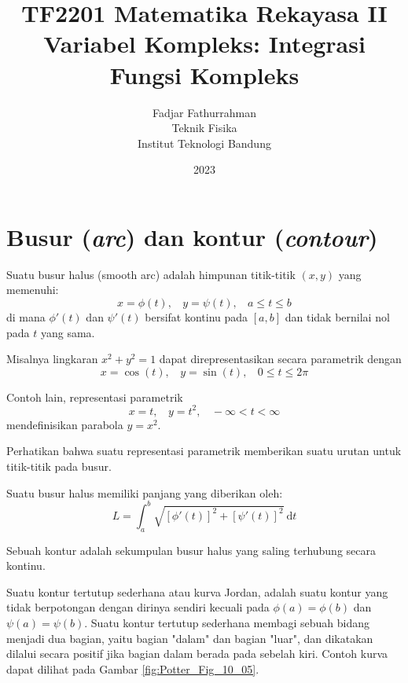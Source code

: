 



\title{%
{\small TF2201 Matematika Rekayasa II}\\
Variabel Kompleks: Integrasi Fungsi Kompleks
}
\author{Fadjar Fathurrahman\\
Teknik Fisika\\
Institut Teknologi Bandung}
\date{2023}
\maketitle


\section{Busur (\textit{arc}) dan kontur (\textit{contour})}

Suatu busur halus (smooth arc) adalah himpunan titik-titik $(x,y)$
yang memenuhi:
\begin{equation*}
x=\phi(t),\ \ \ \ y=\psi(t),\ \ \ \ a\leq t\leq b
\end{equation*}
di mana $\phi'(t)$ dan $\psi'(t)$ bersifat kontinu pada $[a,b]$
dan tidak bernilai nol pada $t$ yang sama.

Misalnya lingkaran $x^{2} + y^{2} = 1$ dapat direpresentasikan secara
parametrik dengan
\begin{equation*}
x=\cos(t),\ \ \ \ y=\sin(t),\ \ \ \ 0 \leq t \leq 2\pi
\end{equation*}

Contoh lain, representasi parametrik
\begin{equation*}
x=t,\ \ \ \ y=t^{2},\ \ \ \ -\infty<t<\infty    
\end{equation*}
mendefinisikan parabola $y=x^{2}$.

Perhatikan bahwa suatu representasi parametrik memberikan suatu urutan
untuk titik-titik pada busur.

Suatu busur halus memiliki panjang yang diberikan oleh:
\begin{equation*}
L = \int_{a}^{b} \sqrt{\left[\phi'(t)\right]^{2}+\left[\psi'(t)\right]^{2}}\ \mathrm{d}t    
\end{equation*}

Sebuah kontur adalah sekumpulan busur halus yang saling terhubung
secara kontinu.

Suatu kontur tertutup sederhana atau kurva Jordan, adalah suatu kontur
yang tidak berpotongan dengan dirinya sendiri kecuali pada $\phi(a)=\phi(b)$
dan $\psi(a)=\psi(b)$. Suatu kontur tertutup sederhana membagi sebuah
bidang menjadi dua bagian, yaitu bagian "dalam" dan bagian "luar",
dan dikatakan dilalui secara positif jika bagian dalam berada pada
sebelah kiri. Contoh kurva dapat dilihat pada Gambar
\ref{fig:Potter_Fig_10_05}.

